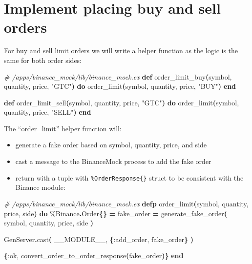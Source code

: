 \documentclass[
  oneside]{book}
\newenvironment{Shaded}{\begin{snugshade}}{\end{snugshade}}
\newcommand{\CommentTok}[1]{\textcolor[rgb]{0.56,0.35,0.01}{\textit{#1}}}
\newcommand{\ConstantTok}[1]{\textcolor[rgb]{0.56,0.35,0.01}{#1}}
\newcommand{\FunctionTok}[1]{\textcolor[rgb]{0.13,0.29,0.53}{\textbf{#1}}}
\newcommand{\KeywordTok}[1]{\textcolor[rgb]{0.13,0.29,0.53}{\textbf{#1}}}
\newcommand{\NormalTok}[1]{#1}
\newcommand{\OperatorTok}[1]{\textcolor[rgb]{0.81,0.36,0.00}{\textbf{#1}}}
\newcommand{\StringTok}[1]{\textcolor[rgb]{0.31,0.60,0.02}{#1}}
\newcommand{\VariableTok}[1]{\textcolor[rgb]{0.00,0.00,0.00}{#1}}
\providecommand{\tightlist}{%
  \setlength{\itemsep}{0pt}\setlength{\parskip}{0pt}}
\begin{document}
\newpage

\section{Implement placing buy and sell orders}\label{implement-placing-buy-and-sell-orders}

For buy and sell limit orders we will write a helper function as the logic is
the same for both order sides:

\begin{Shaded}
\begin{Highlighting}[]
\CommentTok{\# /apps/binance\_mock/lib/binance\_mock.ex}
  \KeywordTok{def}\NormalTok{ order\_limit\_buy}\FunctionTok{(}\NormalTok{symbol, quantity, price, }\StringTok{"GTC"}\FunctionTok{)} \KeywordTok{do}
\NormalTok{    order\_limit}\FunctionTok{(}\NormalTok{symbol, quantity, price, }\StringTok{"BUY"}\FunctionTok{)}
  \KeywordTok{end}

  \KeywordTok{def}\NormalTok{ order\_limit\_sell}\FunctionTok{(}\NormalTok{symbol, quantity, price, }\StringTok{"GTC"}\FunctionTok{)} \KeywordTok{do}
\NormalTok{    order\_limit}\FunctionTok{(}\NormalTok{symbol, quantity, price, }\StringTok{"SELL"}\FunctionTok{)}
  \KeywordTok{end}
\end{Highlighting}
\end{Shaded}

The ``order\_limit'' helper function will:

\begin{itemize}
\tightlist
\item
  generate a fake order based on symbol, quantity, price, and side
\item
  cast a message to the BinanceMock process to add the fake order
\item
  return with a tuple with \texttt{\%OrderResponse\{\}} struct to be consistent with the Binance module:
\end{itemize}

\begin{Shaded}
\begin{Highlighting}[]
\CommentTok{\# /apps/binance\_mock/lib/binance\_mock.ex}
  \KeywordTok{defp}\NormalTok{ order\_limit}\FunctionTok{(}\NormalTok{symbol, quantity, price, side}\FunctionTok{)} \KeywordTok{do}
\NormalTok{    \%}\ConstantTok{Binance}\OperatorTok{.}\ConstantTok{Order}\FunctionTok{\{\}} \OperatorTok{=}
\NormalTok{      fake\_order }\OperatorTok{=}
\NormalTok{      generate\_fake\_order}\FunctionTok{(}
\NormalTok{        symbol,}
\NormalTok{        quantity,}
\NormalTok{        price,}
\NormalTok{        side}
      \FunctionTok{)}

    \ConstantTok{GenServer}\OperatorTok{.}\NormalTok{cast}\FunctionTok{(}
      \ConstantTok{\_\_MODULE\_\_}\NormalTok{,}
      \FunctionTok{\{}\VariableTok{:add\_order}\NormalTok{, fake\_order}\FunctionTok{\}}
    \FunctionTok{)}

    \FunctionTok{\{}\VariableTok{:ok}\NormalTok{, convert\_order\_to\_order\_response}\FunctionTok{(}\NormalTok{fake\_order}\FunctionTok{)\}}
  \KeywordTok{end}
\end{Highlighting}
\end{Shaded}
\end{document}

